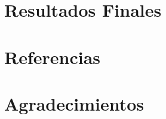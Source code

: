 \documentclass{beamer}
\begin{document}
\section{Resultados Finales}

\begin{frame}
	
\end{frame}

\section{Referencias}

\section{Agradecimientos}

\begin{frame}
	
\end{frame}
\end{document}
